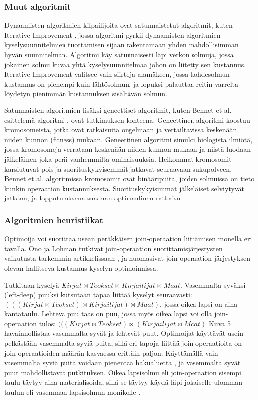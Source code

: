 \documentclass[finnish]{tktltiki2}
\theoremstyle{definition}
\theoremstyle{remark}
\begin{document}
\subsubsection{Muut algoritmit}
Dynaamisten algoritmien kilpailijoita ovat satunnaistetut algoritmit, kuten Iterative Improvement \cite{nahar1986simulated}, jossa algoritmi pyrkii dynaamisten algoritmien kyselysuunnitelmien tuottamisen sijaan rakentamaan yhden mahdollisimman hyvän suunnitelman. Algoritmi käy satunnaisesti läpi verkon solmuja, jossa jokainen solmu kuvaa yhtä kyselysuunnitelmaa johon on liitetty sen kustannus. Iterative Improvement valitsee vain siirtoja alamäkeen, jossa kohdesolmun kustannus on pienempi kuin lähtösolmun, ja lopuksi palauttaa reitin varrelta löydetyn pienimmän kustannuksen sisältävän solmun.

Satunnaisten algoritmien lisäksi geneettiset algoritmit, kuten Bennet et al. esittelemä algoritmi \cite{bennett1991genetic}, ovat tutkimuksen kohteena. Geneettinen algoritmi koostuu kromosomeista, jotka ovat ratkaisuita ongelmaan ja vertailtavissa keskenään niiden kunnon (fitness) mukaan. Geneettinen algoritmi simuloi biologista ilmiötä, jossa kromosomeja verrataan keskenään niiden kunnon mukaan ja niistä luodaan jälkeläinen joka perii vanhemmilta ominaisuuksia. Heikommat kromosomit karsiutuvat pois ja suorituskykyisemmät jatkavat seuraavaan sukupolveen. Bennet et al. algoritmissa kromosomit ovat binääripuita, joiden solmuissa on tieto kunkin operaation kustannuksesta. Suorituskykyisimmät jälkeläiset selviytyvät jatkoon, ja lopputuloksena saadaan optimaalinen ratkaisu. 
\subsubsection{Algoritmien heuristiikat}
Optimoija voi suorittaa usean peräkkäisen join-operaation liittämisen monella eri tavalla. Ono ja Lohman tutkivat join-operaation suorittamisjärjestysten vaikutusta tarkemmin artikkelissaan \cite{ono1990}, ja huomasivat join-operaation järjestyksen olevan hallitseva kustannus kyselyn optimoinnissa. 

Tutkitaan kyselyä $Kirjat \Join Teokset \Join Kirjailijat \Join Maat$. Vasemmalta syväksi (left-deep) puuksi kutsutaan tapaa liittää kyselyt seuraavasti: $(((Kirjat \Join Teokset) \Join Kirjailijat) \Join Maat)$, jossa oikea lapsi on aina kantataulu. Lehtevä puu taas on puu, jossa myös oikea lapsi voi olla join-operaation tulos: $(((Kirjat \Join Teokset) \Join (Kirjailijat \Join Maat)$ Kuva 5 havainnollistaa vasemmalta syvät ja lehtevät puut. Optimoijat käyttävät usein pelkästään vasemmalta syviä puita, sillä eri tapoja liittää join-operaatioita on join-operaatioiden määrän kasvaessa erittäin paljon. Käyttämällä vain vasemmalta syviä puita voidaan pienentää hakualuetta \cite{ioannidis1991left}, ja vasemmalta syvät puut mahdollistavat putkituksen. Oikea lapsisolmu eli join-operaation sisempi taulu täytyy aina materialisoida, sillä se täytyy käydä läpi jokaiselle ulomman taulun eli vasemman lapsisolmun monikolle \cite{ramakrishnan2003database}. 
\end{document}
